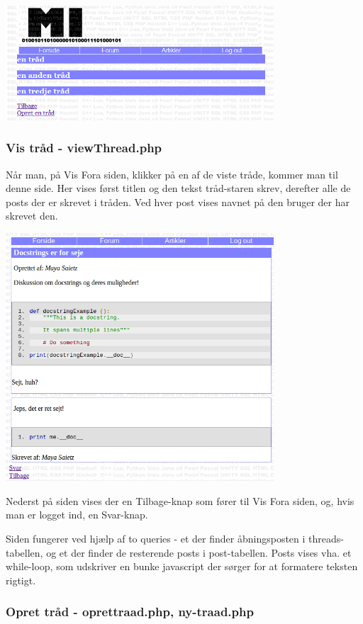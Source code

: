 \documentclass{article}
\begin{document}
\includegraphics[width=100mm]{mi16.png}

\subsubsection[Vis tråd]{Vis tråd - viewThread.php}
Når man, på Vis Fora siden, klikker på en af de viste tråde, kommer man til denne side. Her vises først titlen og den tekst tråd-staren skrev, derefter alle de posts der er skrevet i tråden. Ved hver post vises navnet på den bruger der har skrevet den.

\includegraphics[width=100mm]{mi12.png}

Nederst på siden vises der en Tilbage-knap som fører til Vis Fora siden, og, hvis man er logget ind, en Svar-knap.

Siden fungerer ved hjælp af to queries - et der finder åbningsposten i threads-tabellen, og et der finder de resterende posts i post-tabellen. Posts vises vha. et while-loop, som udskriver en bunke javascript der sørger for at formatere teksten rigtigt.

\subsubsection[Opret tråd]{Opret tråd - oprettraad.php, ny-traad.php}
\end{document}
